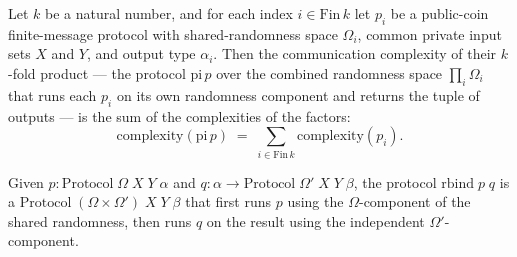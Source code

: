 \begin{theorem}
\label{CommunicationComplexity.PublicCoin.FiniteMessage.Protocol.pi_complexity}
\leanok
{}
Let $k$ be a natural number, and for each index $i \in \mathrm{Fin}\,k$ let $p_i$ be a
public-coin finite-message protocol with shared-randomness space $\Omega_i$, common
private input sets $X$ and $Y$, and output type $\alpha_i$. Then the communication
complexity of their $k$-fold product — the protocol $\mathrm{pi}\,p$ over the combined
randomness space $\prod_i \Omega_i$ that runs each $p_i$ on its own randomness component
and returns the tuple of outputs — is the sum of the complexities of the factors:
\[
\mathrm{complexity}(\mathrm{pi}\,p) \;=\; \sum_{i \in \mathrm{Fin}\,k}
\mathrm{complexity}(p_i).
\]
\end{theorem}

\begin{definition}
\label{CommunicationComplexity.PublicCoin.FiniteMessage.Protocol.rbind}
\leanok
{}
Given $p : \mathrm{Protocol}\;\Omega\;X\;Y\;\alpha$ and
$q : \alpha \to \mathrm{Protocol}\;\Omega'\;X\;Y\;\beta$, the protocol
$\mathrm{rbind}\;p\;q$ is a $\mathrm{Protocol}\;(\Omega \times \Omega')\;X\;Y\;\beta$
that first runs $p$ using the $\Omega$-component of the shared randomness, then runs
$q$ on the result using the independent $\Omega'$-component.
\end{definition}

